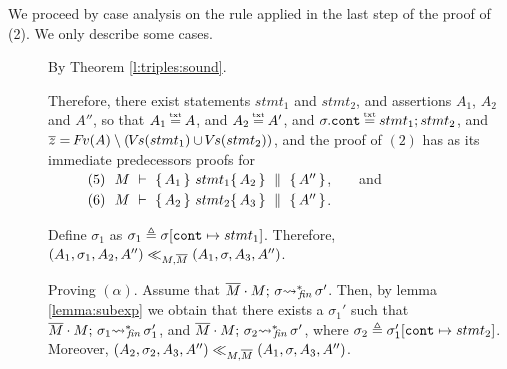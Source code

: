 { \vspace{.2cm}
\noindent
We proceed by case analysis on the  rule applied in the last step of the proof of (2). We only describe some cases.

\begin{description} 
 
 \item[{}] 
 
 By Theorem \ref{l:triples:sound}.

\newcommand{\SPS}{\strut \ \ \hspace{0.5cm} \ \ }
 
\item[{}] 
Therefore, there exist statements $stmt_1$ and $stmt_2$, and assertions  $A_1$, $A_2$ and $A''$, so that $A_1\txteq A$, and $A_2 \txteq A'$, and $\sigma.\prg{cont}\txteq  stmt_1; stmt_2$, and $\overline z = {\hspace{-1pt}F\hspace{-1pt}}v(A) \setminus ({\hspace{-1pt}V\hspace{-1pt}}s(stmt_1) \cup {\hspace{-1pt}V\hspace{-1pt}}s(stmt_2))$, and
the proof of  $(2)$ %
has as its immediate predecessors proofs for \\
$\SPS (5)\ \ M\ \vdash\  \quadruple {A_1} {stmt_1} {A_2} {A''}$,\ \ \ \  and\\
$\SPS (6)\ \  M\ \vdash\  \quadruple {A_2} {stmt_2} {A_3} {A''}$.

Define $\sigma_1$ as  $\sigma_1 \triangleq \sigma[\mbox{\normalfont{\texttt{cont}}} \mapsto stmt_1]$.
Therefore,  $(A_1,\sigma_1,A_2, A'') \ll_{M,\overline{M}} (A_1,\sigma,A_3, A'')$. 

\vspace{.1cm}
Proving $(\alpha)$. Assume that $\overline{M}\cdot M;\, {\sigma} {\rightsquigarrow^*}\!\!_{\mathit{fin}}\, \sigma'$. Then, by lemma \ref{lemma:subexp} we obtain that there exists a $\sigma_1'$ such that $\overline{M}\cdot M;\, {\sigma_1} {\rightsquigarrow^*}\!\!_{\mathit{fin}}\, \sigma_1'$,
and $\overline{M}\cdot M;\, {\sigma_2} {\rightsquigarrow^*}\!\!_{\mathit{fin}}\, \sigma'$, where $\sigma_2 \triangleq \sigma_1'[\mbox{\normalfont{\texttt{cont}}} \mapsto stmt_2]$. Moreover,  $(A_2,\sigma_2,A_3,A'') \ll_{M,\overline{M}} (A_1,\sigma,A_3, A'')$.


\end{description}}
